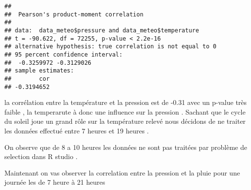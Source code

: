 \documentclass[
]{article}
\newenvironment{Shaded}{\begin{snugshade}}{\end{snugshade}}
\newcommand{\CommentTok}[1]{\textcolor[rgb]{0.56,0.35,0.01}{\textit{#1}}}
\newcommand{\DecValTok}[1]{\textcolor[rgb]{0.00,0.00,0.81}{#1}}
\newcommand{\FunctionTok}[1]{\textcolor[rgb]{0.00,0.00,0.00}{#1}}
\newcommand{\NormalTok}[1]{#1}
\newcommand{\OtherTok}[1]{\textcolor[rgb]{0.56,0.35,0.01}{#1}}
\newcommand{\SpecialCharTok}[1]{\textcolor[rgb]{0.00,0.00,0.00}{#1}}
\begin{document}
\begin{Shaded}
\end{Shaded}

\begin{verbatim}
## 
##  Pearson's product-moment correlation
## 
## data:  data_meteo$pressure and data_meteo$temperature
## t = -90.622, df = 72255, p-value < 2.2e-16
## alternative hypothesis: true correlation is not equal to 0
## 95 percent confidence interval:
##  -0.3259972 -0.3129026
## sample estimates:
##        cor 
## -0.3194652
\end{verbatim}

la corrélation entre la température et la pression est de -0.31 avec un
p-value très faible , la temperarute à donc une influence sur la
pression . Sachant que le cycle du soleil joue un grand rôle sur la
température relevé nous décidons de ne traiter les données effectué
entre 7 heures et 19 heures .

\begin{Shaded}
\end{Shaded}

On observe que de 8 a 10 heures les données ne sont pas traitées par
problème de selection dans R studio .

Maintenant on vas observer la correlation entre la pression et la pluie
pour une journée les de 7 heure à 21 heures

\begin{Shaded}
\end{Shaded}
\end{document}
